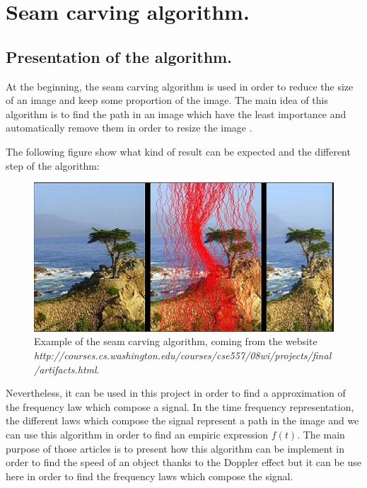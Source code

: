 


\chapter{Seam carving algorithm.}

\section{Presentation of the algorithm.}


At the beginning, the seam carving algorithm is used in order to reduce the size of an image and keep some proportion of the image. The main idea of this algorithm is to find the path in an image which have the least importance and automatically remove them in order to resize the image \cite{avidan2007seam}.

The following figure show what kind of result can be expected and the different step of the algorithm:

\begin{figure}[H]
\centering
    \includegraphics[scale=1,angle=0]{Images/ankit-rahul.jpg}
    \caption{Example of the seam carving algorithm, coming from the website \textit{http://courses.cs.washington.edu/courses/cse557/08wi/projects/final/artifacts.html}.}
    \label{fig:ankit-rahul}
\end{figure}


Nevertheless, it can be used in this project in order to find a approximation of the frequency law which compose a signal. In the time frequency representation, the different laws which compose the signal represent a path in the image and we can use this algorithm in order to find an empiric expression $f(t)$.
The main purpose of those articles \cite{barnwal2013doppler} \cite{couvreur1997doppler} \cite{cevher2009vehicle} is to present how this algorithm can be implement in order to find the speed of an object thanks to the Doppler effect but it can be use here in order to find the frequency laws which compose the signal. 

